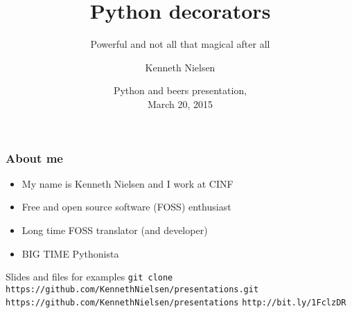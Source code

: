 \documentclass{beamer}
\title{Python decorators}
\subtitle{Powerful and not all that magical after all}
\author{Kenneth Nielsen\inst{1}}
\institute
{
  \inst{1}%
  Center for Individual Nanoparticle Functionality (CINF)\\
  Institute of Physics\\
  Technical University of Denmark (DTU)
}
\date{
  Python and beers presentation,\\
  March 20, 2015}
\begin{document}
\frame{\titlepage}

\begin{frame}
  \frametitle{About me}
  \begin{itemize}
    \item My name is Kenneth Nielsen and I work at CINF
    \item Free and open source software (FOSS) enthusiast
    \item Long time FOSS translator (and developer)
    \item BIG TIME Pythonista
  \end{itemize}
  \begin{block}{Slides and files for examples}
    \center
    \footnotesize
    \texttt{git clone https://github.com/KennethNielsen/presentations.git}\newline
    \newline
    \texttt{https://github.com/KennethNielsen/presentations}
    \texttt{http://bit.ly/1FclzDR}
  \end{block}
\end{frame}



\end{document}
